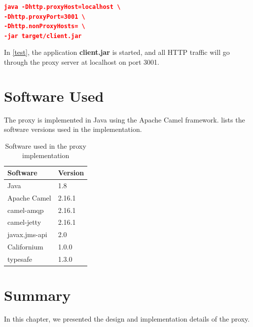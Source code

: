 \begin{lstlisting}[frame=single, language=json, caption="Setting a proxy on the \gls{jvm}", label=test]
java -Dhttp.proxyHost=localhost \
-Dhttp.proxyPort=3001 \
-Dhttp.nonProxyHosts= \
-jar target/client.jar
\end{lstlisting}

In \cref{test}, the application \textbf{client.jar} is started, and all HTTP
traffic will go through the proxy server at localhost on port 3001.


\section{Software Used}

The proxy is implemented in Java using the Apache Camel framework.
 lists the software versions used in the
implementation.

\begin{table}[h]
\begin{tabular}{|l|l|}
    \hline
\textbf{Software} & \textbf{Version} \\ \hline
Java            & 1.8           \\ \hline
Apache Camel     & 2.16.1           \\ \hline
camel-amqp      & 2.16.1            \\ \hline
camel-jetty      & 2.16.1            \\ \hline
javax.jms-api      & 2.0            \\ \hline
Californium      & 1.0.0            \\ \hline
typesafe      & 1.3.0            \\ \hline
\end{tabular}
\caption{Software used in the proxy implementation}
\label{table:implementation-versions}
\end{table}

\section{Summary}

In this chapter, we presented the design and implementation details of the proxy.
